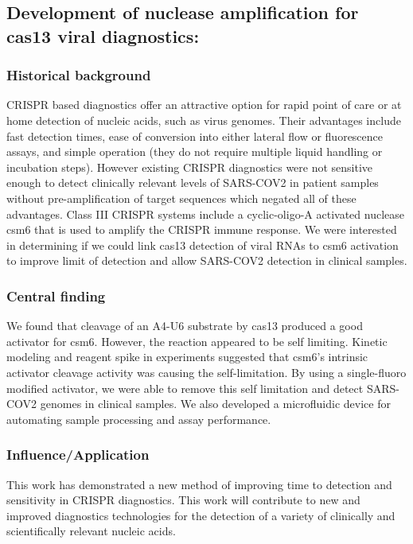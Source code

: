 \documentclass{article}
\begin{document}
\leavevmode\pagebreak


\newrefsection
\subsection{Development of nuclease amplification for cas13 viral diagnostics:}
\subsubsection{Historical background}
CRISPR based diagnostics offer an attractive option for rapid point of care or at home detection of nucleic acids, such as virus genomes.
Their advantages include fast detection times, ease of conversion into either lateral flow or fluorescence assays, and simple operation (they do not require multiple liquid handling or incubation steps).
However existing CRISPR diagnostics were not sensitive enough to detect clinically relevant levels of SARS-COV2 in patient samples without pre-amplification of target sequences which negated all of these advantages.
Class III CRISPR systems include a cyclic-oligo-A activated nuclease csm6 that is used to amplify the CRISPR immune response.
We were interested in determining if we could link cas13 detection of viral RNAs to csm6 activation to improve limit of detection and allow SARS-COV2 detection in clinical samples.
%
\subsubsection{Central finding}
We found that cleavage of an A4-U6 substrate by cas13 produced a good activator for csm6.
However, the reaction appeared to be self limiting.
Kinetic modeling and reagent spike in experiments suggested that csm6's intrinsic activator cleavage activity was causing the self-limitation.
By using a single-fluoro modified activator, we were able to remove this self limitation and detect SARS-COV2 genomes in clinical samples.
We also developed a microfluidic device for automating sample processing and assay performance.
%
\subsubsection{Influence/Application}
This work has demonstrated a new method of improving time to detection and sensitivity in CRISPR diagnostics. 
This work will contribute to new and improved diagnostics technologies for the detection of a variety of clinically and scientifically relevant nucleic acids.
%
\end{document}

